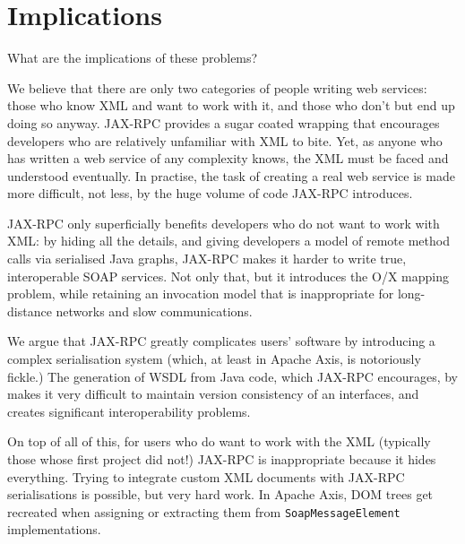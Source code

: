 \section{Implications}
\label{implications}

What are the implications of these problems?

We believe that there are only two categories of people writing web
services: those who know XML and want to work with it, and those who
don't but end up doing so anyway. JAX-RPC provides a sugar coated
wrapping that encourages developers who are relatively unfamiliar with
XML to bite. Yet, as anyone who has written a web service of any
complexity knows, the XML must be faced and understood eventually. In
practise, the task of creating a real web service is made more
difficult, not less, by the huge volume of code JAX-RPC introduces.

JAX-RPC only superficially benefits developers who do not want to work
with XML: by hiding all the details, and giving developers a model of
remote method calls via serialised Java graphs, JAX-RPC makes it harder
to write true, interoperable SOAP services. Not only that, but it
introduces the O/X mapping problem, while retaining an invocation model
that is inappropriate for long-distance networks and slow
communications.

We argue that JAX-RPC greatly complicates users' software
by introducing a complex serialisation system (which, at least in
Apache Axis, is notoriously fickle.) The generation of WSDL from Java
code, which JAX-RPC encourages, by makes it very difficult to
maintain version consistency of an interfaces, and creates significant
interoperability problems. 

On top of all of this, for users who do want to work with the XML
(typically those whose first project did not!) JAX-RPC is
inappropriate because it hides everything. Trying to integrate custom
XML documents with JAX-RPC serialisations is possible, but very hard
work. In Apache Axis, DOM trees get recreated when assigning or
extracting them from {\tt SoapMessageElement} implementations.
% 


